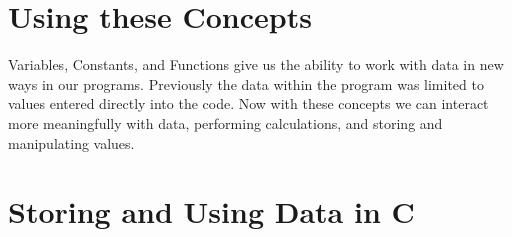 

\clearpage
\section{Using these Concepts} %
\label{sec:using_these_concepts_storing_using_data}

Variables, Constants, and Functions give us the ability to work with data in new ways in our programs. Previously the data within the program was limited to values entered directly into the code. Now with these concepts we can interact more meaningfully with data, performing calculations, and storing and manipulating values.







\clearpage
\def\pageLang{c}
\section{Storing and Using Data in C} %
\label{sec:storing_and_using_data_in_c}





% 













